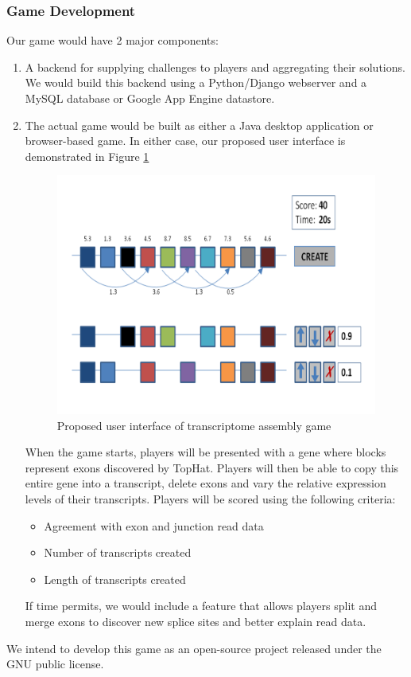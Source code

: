 \documentclass[12pt]{article}
\begin{document}
\subsubsection*{Game Development}
Our game would have 2 major components:
\begin{enumerate}
\item A backend for supplying challenges to players and aggregating their solutions. We would build this backend using a Python/Django webserver and a MySQL database or Google App Engine datastore.
\item The actual game would be built as either a Java desktop application or browser-based game. In either case, our proposed user interface is demonstrated in Figure \ref{fig:proposedui}
\begin{figure}[H]
\includegraphics[scale=0.5]{ProposedUI.png}
\caption{Proposed user interface of transcriptome assembly game}
\centering
\label{fig:proposedui}
\end{figure}
When the game starts, players will be presented with a gene where blocks represent exons discovered by TopHat. Players will then be able to copy this entire gene into a transcript, delete exons and vary the relative expression levels of their transcripts. Players will be scored using the following criteria:
\begin{itemize}
\item Agreement with exon and junction read data
\item Number of transcripts created
\item Length of transcripts created
\end{itemize} 
If time permits, we would include a feature that allows players split and merge exons to discover new splice sites and better explain read data.
\end{enumerate}
We intend to develop this game as an open-source project released under the GNU public license.
\end{document}
